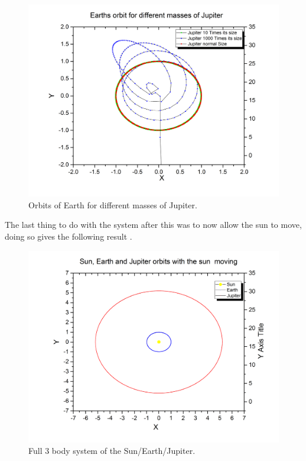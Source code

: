 \documentclass[12pt,righttag]{article}
\begin{document}
	
			\begin{figure}
				\begin{center}
				\includegraphics[scale=0.35]{Graph16.png}
					\caption{\label{SEJ} Orbits of Earth for different masses of Jupiter. }
					\end{center}
				\end{figure}
				
				The last thing to do with the system after this was to now allow the sun to move, doing so gives the following result .
				
				\begin{figure}
					\begin{center}
					\includegraphics[scale=0.35]{Graph17.png}
					\caption{\label{SEJ2} Full 3 body system of the Sun/Earth/Jupiter. }
					\end{center}
					\end{figure}
					
\end{document}
